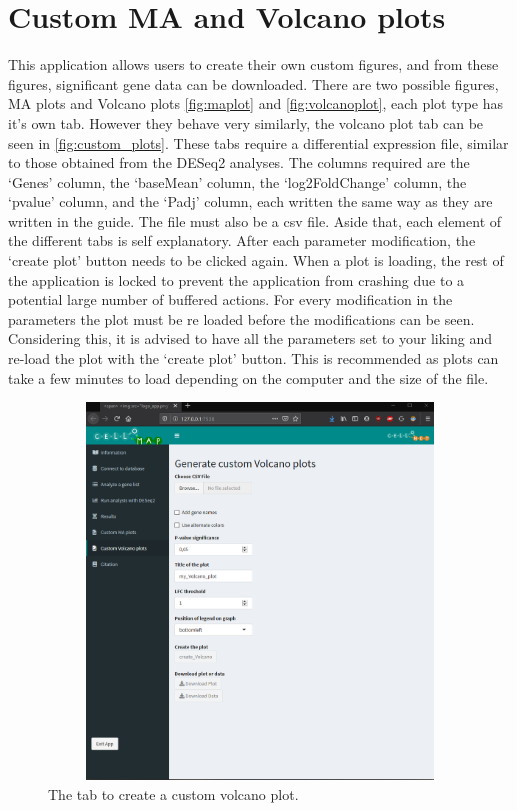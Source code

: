 \documentclass[11pt]{article}
\begin{document}
\section{Custom MA and Volcano plots \label{custom_plots}}
This application allows users to create their own custom figures, and from these figures, significant gene data can be downloaded. There are two possible figures, MA plots and Volcano plots \autoref{fig:maplot} and \autoref{fig:volcanoplot}, each plot type has it's own tab. However they behave very similarly, the volcano plot tab can be seen in \autoref{fig:custom_plots}. 
These tabs require a differential expression file, similar to those obtained from the \acrshort{DESeq2} analyses. The columns required are the `Genes' column, the `baseMean' column, the `log2FoldChange' column, the `pvalue' column, and the `\acrshort{Padj}' column, each written the same way as they are written in the guide. The file must also be a \acrshort{csv} file.
Aside that, each element of the different tabs is self explanatory. After each parameter modification, the `create plot' button needs to be clicked again. When a plot is loading, the rest of the application is locked to prevent the application from crashing due to a potential large number of buffered actions. For every modification in the parameters the plot must be re loaded before the modifications can be seen. Considering this, it is advised to have all the parameters set to your liking and re-load the plot with the `create plot' button. This is recommended as plots can take a few minutes to load depending on the computer and the size of the file.

\begin{figure}[h!]
\centering
\includegraphics[width=15cm,height=10cm,keepaspectratio]{custom_volcano_tab.png}
\caption{The tab to create a custom volcano plot.}
\label{fig:custom_plots}
\end{figure}
\end{document}
